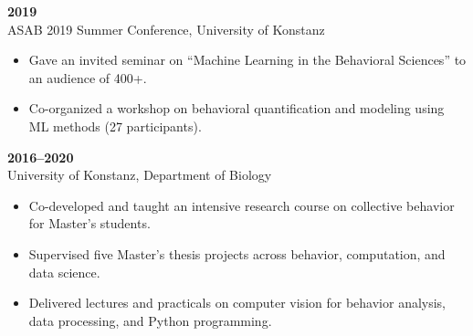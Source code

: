 \documentclass[10pt,a4paper]{article}
\begin{document}
	\vspace{4pt}
	\textbf{2019}\\
	ASAB 2019 Summer Conference, University of Konstanz
	\begin{itemize}
		\item Gave an invited seminar on “Machine Learning in the Behavioral Sciences” to an audience of 400+.
		\item Co-organized a workshop on behavioral quantification and modeling using ML methods (27 participants).
	\end{itemize}
	
	\vspace{4pt}
	\textbf{2016--2020}\\
	University of Konstanz, Department of Biology
	\begin{itemize}
		\item Co-developed and taught an intensive research course on collective behavior for Master’s students.
		\item Supervised five Master’s thesis projects across behavior, computation, and data science.
		\item Delivered lectures and practicals on computer vision for behavior analysis, data processing, and Python programming.
	\end{itemize}
	
	
	
	
	
	
\end{document}

